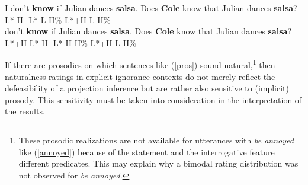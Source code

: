 \documentclass[11pt,fleqn]{article}
\newcommand{\6}{\mbox{$[\hspace*{-.6mm}[$}}
\newcommand{\9}{\mbox{$]\hspace*{-.6mm}]$}}
\begin{document}
\begin{exe}
\ex\label{pros} 
\begin{xlist}
\ex \gll I don't {\bf know} if Julian dances {\bf salsa}. Does {\bf Cole} know that Julian dances {\bf salsa}? 
\\ {} {} {L* H-} {} {} {} {L* L-H\%} {} L*+H {} {} {} {} {\hspace*{.2cm} L-H\%} \\ \glt 
\ex {} don't {\bf know} if Julian dances {\bf salsa}. Does {\bf Cole} know that Julian dances {\bf salsa}? 
\\ L*+H {} {L* H-} {} {} {} {L* H-H\%} {} L*+H {} {} {} {} {\hspace*{.2cm} L-H\%} \\ \glt 
\end{xlist}
\end{exe}
If there are prosodies on which sentences like (\ref{pros}) sound natural,\footnote{These prosodic realizations are not available for utterances with \emph{be annoyed} like (\ref{annoyed}) because of the statement and the interrogative feature different predicates. This may explain why a bimodal rating distribution was not observed for \emph{be annoyed}.} then naturalness ratings in explicit ignorance contexts do not merely reflect the defeasibility of a projection inference but are rather also sensitive to (implicit) prosody. This sensitivity must be taken into consideration in the interpretation of the results.

\end{document}
